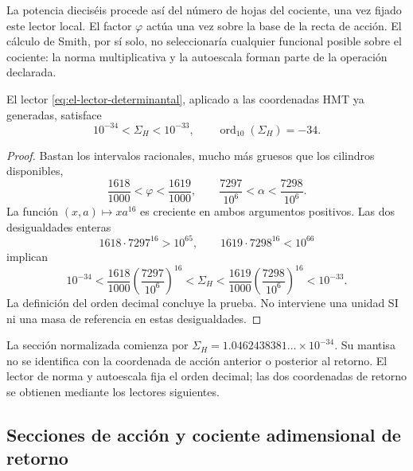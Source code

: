 La potencia dieciséis procede así del número de hojas del cociente, una
vez fijado este lector local. El factor \(\varphi\) actúa una vez sobre
la base de la recta de acción. El cálculo de Smith, por sí solo, no
seleccionaría cualquier funcional posible sobre el cociente: la norma
multiplicativa y la autoescala forman parte de la operación declarada.

\begin{theorem}
El lector \eqref{eq:el-lector-determinantal}, aplicado a las coordenadas
HMT ya generadas, satisface
\begin{equation}
 10^{-34}<\Sigma_H<10^{-33},\qquad
 \operatorname{ord}_{10}(\Sigma_H)=-34.
 \label{eq:el-decada}
\end{equation}
\end{theorem}
\begin{proof}
Bastan los intervalos racionales, mucho más gruesos que los cilindros
disponibles,
\[
 \frac{1618}{1000}<\varphi<\frac{1619}{1000},\qquad
 \frac{7297}{10^6}<\alpha<\frac{7298}{10^6}.
\]
La función \((x,a)\mapsto xa^{16}\) es creciente en ambos argumentos
positivos. Las dos desigualdades enteras
\[
 1618\cdot7297^{16}>10^{65},\qquad
 1619\cdot7298^{16}<10^{66}
\]
implican
\[
 10^{-34}
 <\frac{1618}{1000}\left(\frac{7297}{10^6}\right)^{16}
 <\Sigma_H
 <\frac{1619}{1000}\left(\frac{7298}{10^6}\right)^{16}
 <10^{-33}.
\]
La definición del orden decimal concluye la prueba. No interviene una
unidad SI ni una masa de referencia en estas desigualdades.
\end{proof}

La sección normalizada comienza por
\(\Sigma_H=1.0462438381\ldots\times10^{-34}\). Su mantisa no se
identifica con la coordenada de acción anterior o posterior al retorno.
El lector de norma y autoescala fija el orden decimal; las dos coordenadas de
retorno se obtienen mediante los lectores siguientes.




\subsection{Secciones de acción y cociente adimensional de retorno}

